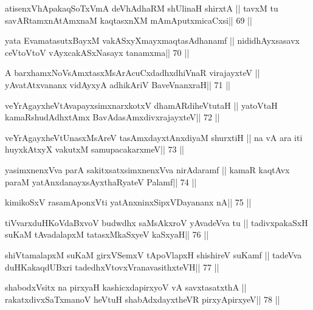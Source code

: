 \begin{shl}
atisenxVhA\s pakaqSoTxVmA deVhAdhaRM shUlinaH shirxtA ||
tavxM tu savARtamxnA\s\s tAmxnaM kaqtasxnXM mAmAputxmicaCxsi\hfill || 69 ||
\end{shl}

\begin{shl}
yata EvamatasutxBayxM vakASxyXmayxmaqtasAdhanamf ||
nididhAyxsasavx ceVtoV\s toV vAyxcakASxNasayx tanamxma\hfill || 70 ||
\end{shl}

\begin{shl}
A barxhamxNoV\s sAmxtasxMsArAcuCxdadhxdhiVnaR virajayxteV ||
yAvatAtxvananx vidAyxyA adhikAriV BaveVnanxraH\hfill || 71 ||
\end{shl}

\begin{shl}
veYrAgayxheVtAvapayxsimxnarxkotxV dhamARdiheVtutaH ||
yatoV\s taH kamaRshudAdhxtAmx BavAdasAmxdivxrajayxteV\hfill || 72 ||
\end{shl}

\begin{shl}
veYrAgayxheVtUnasxMsAreV tasAmxdayxtAnxdiyaM shurxtiH ||
na vA ara iti huyxkAtxyX vakutxM samupacakarxmeV\hfill || 73 ||
\end{shl}

\begin{shl}
yasimxnenxVva parA sakitxsatxsimxnenxVva nirAdaramf ||
kamaR kaqtAvx paraM yatAnxdanayxsAyxthaRyateV Palamf\hfill || 74 ||
\end{shl}

\begin{shl}
kimikoSxV rasamAponxVti yatAnxninxSipxVDayananx nA\hfill || 75 ||
\end{shl}

\begin{shl}
tiVvarxduHKoVdaBxvoV budwdhx saMsAkxroV yAvadeVva tu ||
tadivxpakaSxH suKaM tAvadalapxM tatasxMkaSxyeV kaSxyaH\hfill || 76 ||
\end{shl}

\begin{shl}
shiVtamalapxM suKaM girxVSemxV tApoV\s lapxH shishireV suKamf ||
tadeVva duHKakaqdUBxri tadedhxVtovxVranavasithxteVH\hfill || 77 ||
\end{shl}

\begin{shl}
shabodxV\s sitx na pirxyaH kashicxdapirxyoV vA savxtasatxthA ||
rakatxdivxSaTxmanoV heVtuH shabAdxdayxtheVR pirxyApirxyeV\hfill || 78 ||
\end{shl}

